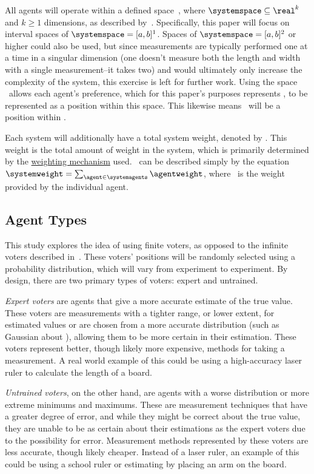 All agents will operate within a defined space~\systemspace, where
$\systemspace \subseteq \real^k$ and $k \geq 1$ dimensions, as described
by~\cite[para.~2.1]{Cohensius2017}.
Specifically, this paper will focus on interval spaces of
$\systemspace = [a, b]^1$.
Spaces of $\systemspace = [a, b]^2$ or higher could also be used, but since
measurements are typically performed one at a time in a singular dimension (one
doesn't measure both the length and width with a single measurement--it takes
two) and would ultimately only increase the complexity of the system, this
exercise is left for further work.
Using the space \systemspace\ allows each agent's preference, which for this
paper's purposes represents \agenttruth, to be represented as a position within
this space.
This likewise means \systemtruth\ will be a position within \systemspace.

Each system will additionally have a total system weight, denoted by
\systemweight.
This weight is the total amount of weight in the system, which is primarily
determined by the \hyperref[subsec:weighting-mechanisms]{weighting mechanism} used.
\systemweight\ can be described simply by the equation
$\systemweight = \sum_{\agent \in \systemagents} \agentweight$, where \agentweight\
is the weight provided by the individual agent.

\subsection{Agent Types}\label{subsec:agent-types}
This study explores the idea of using finite voters, as opposed to the
infinite voters described in~\cite{Cohensius2017}.
These voters' positions will be randomly selected using a probability distribution,
which will vary from experiment to experiment.
By design, there are two primary types of voters: expert and untrained.

\textit{Expert voters} are agents that give a more accurate estimate of the
true value.
These voters are measurements with a tighter range, or lower extent, for estimated
values or are chosen from a more accurate distribution (such as Gaussian about
\truth), allowing them to be more certain in their estimation.
These voters represent better, though likely more expensive, methods for
taking a measurement.
A real world example of this could be using a high-accuracy laser ruler to calculate
the length of a board.

\textit{Untrained voters}, on the other hand, are agents with a worse
distribution or more extreme minimums and maximums.
These are measurement techniques that have a greater degree of error, and while they
might be correct about the true value, they are unable to be as certain about their
estimations as the expert voters due to the possibility for error.
Measurement methods represented by these voters are less accurate, though
likely cheaper.
Instead of a laser ruler, an example of this could be using a school ruler or
estimating by placing an arm on the board.

